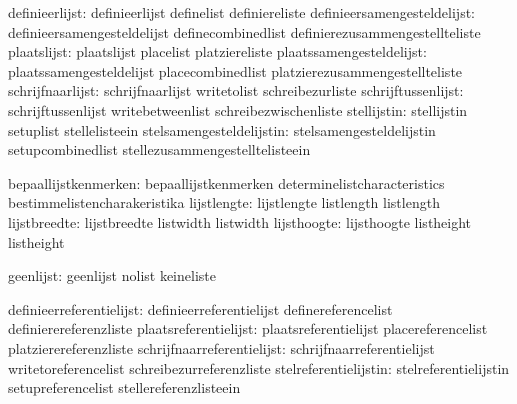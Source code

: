                definieerlijst:  definieerlijst               definelist
                                definiereliste
  definieersamengesteldelijst:  definieersamengesteldelijst  definecombinedlist
                                definierezusammengestellteliste
                  plaatslijst:  plaatslijst                  placelist
                                platziereliste
     plaatssamengesteldelijst:  plaatssamengesteldelijst     placecombinedlist
                                platzierezusammengestellteliste
             schrijfnaarlijst:  schrijfnaarlijst             writetolist
                                schreibezurliste
           schrijftussenlijst:  schrijftussenlijst           writebetweenlist
                                schreibezwischenliste
                  stellijstin:  stellijstin                  setuplist
                                stellelisteein
     stelsamengesteldelijstin:  stelsamengesteldelijstin     setupcombinedlist
                                stellezusammengestelltelisteein

         bepaallijstkenmerken:  bepaallijstkenmerken         determinelistcharacteristics
                                bestimmelistencharakeristika
                  lijstlengte:  lijstlengte                  listlength 
                                listlength %
                 lijstbreedte:  lijstbreedte                 listwidth
                                listwidth  %
                  lijsthoogte:  lijsthoogte                  listheight
                                listheight %

                    geenlijst:  geenlijst                    nolist
                                keineliste %


     definieerreferentielijst:  definieerreferentielijst     definereferencelist
                                definierereferenzliste
        plaatsreferentielijst:  plaatsreferentielijst        placereferencelist
                                platzierereferenzliste
   schrijfnaarreferentielijst:  schrijfnaarreferentielijst   writetoreferencelist
                                schreibezurreferenzliste
        stelreferentielijstin:  stelreferentielijstin        setupreferencelist
                                stellereferenzlisteein

